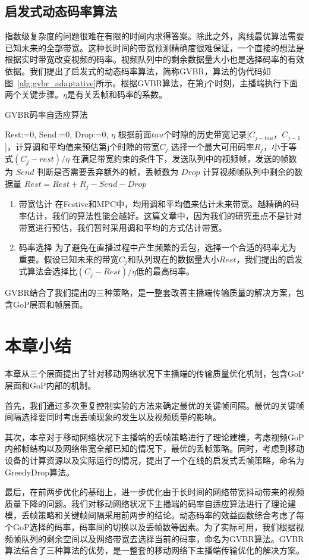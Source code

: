 \subsection{启发式动态码率算法}
指数级复杂度的问题很难在有限的时间内求得答案。除此之外，离线最优算法需要已知未来的全部带宽。这种长时间的带宽预测精确度很难保证，一个直接的想法是根据实时带宽改变视频的码率。视频队列中的剩余数据量大小也是选择码率的有效依据。我们提出了启发式的动态码率算法，简称GVBR，算法的伪代码如图~\ref{alg:gvbr_adaptative}所示。根据GVBR算法，在第j个时刻，主播端执行下面两个关键步骤。$\eta$是有关丢帧和码率的系数。

\begin{algorithm}[htb]
\caption{GVBR码率自适应算法}
\label{alg:gvbr_adaptative}
\begin{algorithmic}[1]
\State Rest:=0, Send:=0, Drop:=0, $\eta$
\State 根据前面$tau$个时隙的历史带宽记录[$C_{j-tau}$，$C_{j-1}$]，计算调和平均值来预估第j个时隙的带宽$C_j$
\State 选择一个最大可用码率$R_j$，小于等式$(C_j-rest)/\eta$
\State 在满足带宽约束的条件下，发送队列中的视频帧，发送的帧数为 $Send$
\State 判断是否需要丢弃额外的帧，丢帧数为 $Drop$
\State 计算视频帧队列中剩余的数据量 $Rest=Rest+R_j-Send-Drop$
\EndFor
\end{algorithmic}
\end{algorithm}

\begin{enumerate}
  \item 带宽估计 在Festive和MPC中，均用调和平均值来估计未来带宽。越精确的码率估计，我们的算法性能会越好。这篇文章中，因为我们的研究重点不是针对带宽进行预估，我们暂时采用调和平均的方式估计带宽。
  \item 码率选择 为了避免在直播过程中产生频繁的丢包，选择一个合适的码率尤为重要。假设已知未来的带宽$C_j$和队列现在的数据量大小$Rest$，我们提出的启发式算法会选择比$(C_j-Rest)/\eta$低的最高码率。
\end{enumerate}

GVBR结合了我们提出的三种策略，是一整套改善主播端传输质量的解决方案，包含GoP层面和帧层面。

\section{本章小结}
本章从三个层面提出了针对移动网络状况下主播端的传输质量优化机制，包含GoP层面和GoP内部的机制。

首先，我们通过多次重复控制实验的方法来确定最优的关键帧间隔。最优的关键帧间隔选择要同时考虑丢帧现象的发生以及视频质量的影响。

其次，本章对于移动网络状况下主播端的丢帧策略进行了理论建模，考虑视频GoP内部帧结构以及网络带宽全部已知的情况下，最优的丢帧策略。同时，考虑到移动设备的计算资源以及实际运行的情况，提出了一个在线的启发式丢帧策略，命名为GreedyDrop算法。

最后，在前两步优化的基础上，进一步优化由于长时间的网络带宽抖动带来的视频质量下降的问题。我们对移动网络状况下主播端的码率自适应算法进行了理论建模，丢帧策略和关键帧间隔采用前两步的结论。动态码率的效益函数综合考虑了每个GoP选择的码率，码率间的切换以及丢帧数等因素。为了实际可用，我们根据视频帧队列的剩余空间以及网络带宽去选择当前的码率，命名为GVBR算法。GVBR算法结合了三种算法的优势，是一整套的移动网络下主播端传输优化的解决方案。